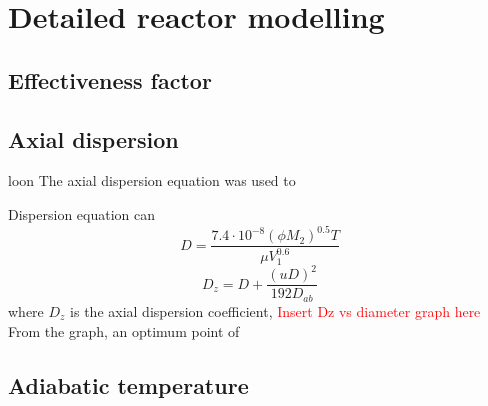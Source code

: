 \section{Detailed reactor modelling}
\subsection{Effectiveness factor}

\subsection{Axial dispersion}
loon
The axial dispersion equation was used to 

Dispersion equation can
\begin{equation}
    D=\frac{7.4\cdot10^{-8}(\phi M_2)^{0.5}T}{\mu V_1^{0.6}}
    \label{wilkechang}
\end{equation}
\begin{equation}
    D_z=D+\frac{(uD)^2}{192D_{ab}}
    \label{axial dispersion coefficient}
\end{equation}
where $D_z$ is the axial dispersion coefficient, 
\textcolor{red}{Insert Dz vs diameter graph here} 
From the graph, an optimum point of 
\subsection{Adiabatic temperature}